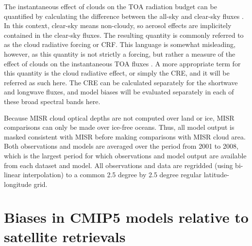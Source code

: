 The instantaneous effect of clouds on the TOA radiation budget can be
quantified by calculating the difference between the all-sky and
clear-sky fluxes
\citep[e.g.,][]{ellis_and_vonderhaar_1976, ramanathan_1987, ramanathan_et_al_1989}.
In this context, clear-sky means non-cloudy, so aerosol effects are
implicitely contained in the clear-sky fluxes. The resulting quantity is
commonly referred to as the cloud radiative forcing or CRF. This
language is somewhat misleading, however, as this quantity is not
strictly a forcing, but rather a measure of the effect of clouds on the
instantaneous TOA fluxes \citep{stephens_2005}. A more appropriate term
for this quantity is the cloud radiative effect, or simply the CRE, and
it will be referred as such here. The CRE can be calculated separately
for the shortwave and longwave fluxes, and model biases will be
evaluated separately in each of these broad spectral bands here.

Because MISR cloud optical depths are not computed over land or ice,
MISR comparisons can only be made over ice-free oceans. Thus, all model
output is masked consistent with MISR before making comparisons with
MISR cloud area. Both observations and models are averaged over the
period from 2001 to 2008, which is the largest period for which
observations and model output are available from each dataset and model.
All observations and data are regridded (using bi-linear interpolation)
to a common 2.5 degree by 2.5 degree regular latitude-longitude grid.

\section{Biases in CMIP5 models relative to satellite
retrievals}\label{biases-in-cmip5-models-relative-to-satellite-retrievals}

